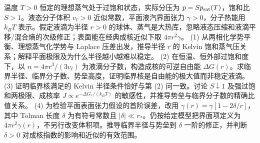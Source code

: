 温度 \(T>0\) 恒定的理想蒸气处于过饱和状态，实际分压为 \(p=Sp_{\rm sat}(T)\)，饱和比 \(S>1\)。液态分子体积 \(v_\ell>0\) 近似常数，平面液汽界面张力 \(\gamma>0\)，分子热能用 \(k_BT\) 表示。假定液滴为半径 \(r>0\) 的球体、蒸气是大热库，忽略液态压缩和液滴平移/混合熵的次级修正；表面能在经典成核近似下取 \(4\pi r^2\gamma\)。
(1) 从两相化学势平衡、理想蒸气化学势与 Laplace 压差出发，推导半径 \(r\) 的 Kelvin 饱和蒸气压关系；解释平面极限及为什么半径越小越难以稳定。
(2) 在恒温、恒外部过饱和度下，以 \(n=4\pi r^3/(3v_\ell)\) 为液滴分子数，构造成核的可逆自由能 \(\Delta G(r)\)。求临界半径、临界分子数、势垒高度，证明临界核是自由能的极大值而非稳定液滴。
(3) 证明临界核满足的 Kelvin 半径条件恰好与第 (2) 问一致。讨论 \(S\downarrow1\) 及强过饱和两极限、成核率 \(J\propto e^{-\Delta G_*/(k_BT)}\) 的敏感性，并推导势垒与临界分子数的精确比值关系。
(4) 为检验平面表面张力假设的首阶误差，改用 \(\gamma(r)=\gamma[1-2\delta/r]\)，其中 Tolman 长度 \(\delta\) 为有符号常数且 \(|\delta|\ll r_*\)。仍按给定模型把界面项定义为 \(4\pi r^2\gamma(r)\)，不另行改变体积项。推导临界半径与势垒到 \(\delta\) 一阶的修正，并判断 \(\delta>0\) 对成核指数的影响和近似的有效范围。